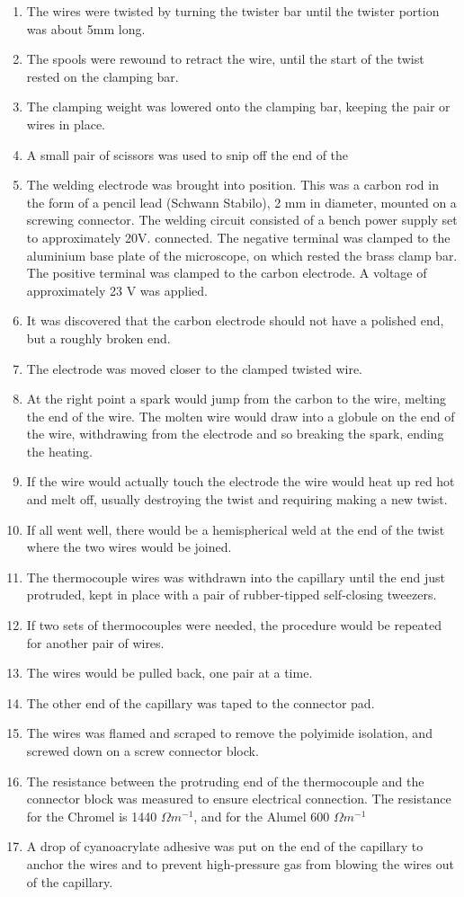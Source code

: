 \begin{enumerate}
	\item The wires were twisted by turning the twister bar until the twister portion was about 5mm long.
	\item The spools were rewound to retract the wire, until the start of the twist rested on the clamping bar.
	\item The clamping weight was lowered onto the clamping bar, keeping the pair or wires in place.
	\item A small pair of scissors was used to snip off the end of the
	\item The welding electrode was brought into position. This was a carbon rod in the form of a pencil lead (Schwann Stabilo), 2 mm in diameter, mounted on a screwing connector. The welding circuit consisted of a bench power supply set to approximately 20V. connected. The negative terminal was clamped to the aluminium base plate of the microscope, on which rested the brass clamp bar. The positive terminal was clamped to the carbon electrode. A voltage of approximately 23 V was applied.
	\item It was discovered that the carbon electrode should not have a polished end, but a roughly broken end. 
	\item The electrode was moved closer to the clamped twisted wire.
	\item At the right point a spark would jump from the carbon to the wire, melting the end of the wire. The molten wire would draw into a globule on the end of the wire, withdrawing from the electrode and so breaking the spark, ending the heating.
	\item If the wire would actually touch the electrode the wire would heat up red hot and melt off, usually destroying the twist and requiring making a new twist.
	\item If all went well, there would be a hemispherical weld at the end of the twist where the two wires would be joined.
	\item The thermocouple wires was withdrawn into the capillary until the end just protruded, kept in place with a pair of rubber-tipped self-closing tweezers.
	\item If two sets of thermocouples were needed, the procedure would be repeated for another pair of wires.
	\item The wires would be pulled back, one pair at a time.
	\item The other end of the capillary was taped to the connector pad.
	\item The wires was flamed and scraped to remove the polyimide isolation, and screwed down on a screw connector block.
	\item The resistance between the protruding end of the thermocouple and the connector block was measured to ensure electrical connection. The resistance for the Chromel is 1440 $\Omega{m}^{-1}$, and for the Alumel 600 $\Omega{m}^{-1}$
	\item A drop of cyanoacrylate adhesive was put on the end of the capillary to anchor the wires and to prevent high-pressure gas from blowing the wires out of the capillary. 
\end{enumerate}
